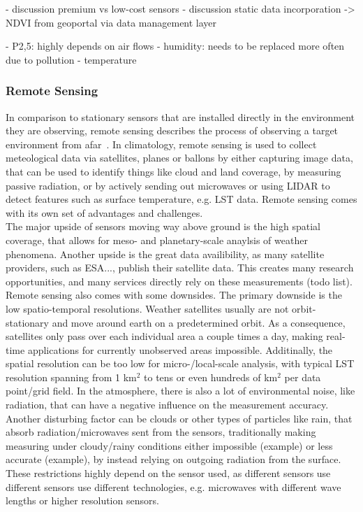 
- discussion premium vs low-cost sensors
- discussion static data incorporation -> NDVI from geoportal via data management layer

- P2,5: highly depends on air flows
- humidity: needs to be replaced more often due to pollution
- temperature

\subsubsection{Remote Sensing}

In comparison to stationary sensors that are installed directly in the environment they are observing, remote sensing describes the process of observing a target environment from afar~\cite{campbell2011introduction}. In climatology, remote sensing is used to collect meteological data via satellites, planes or ballons by either capturing image data, that can be used to identify things like cloud and land coverage, by measuring passive radiation, or by actively sending out microwaves or using LIDAR to detect features such as surface temperature, e.g. LST data. Remote sensing comes with its own set of advantages and challenges.\\
The major upside of sensors moving way above ground is the high spatial coverage, that allows for meso- and planetary-scale anaylsis of weather phenomena. Another upside is the great data availibility, as many satellite providers, such as ESA..., publish their satellite data. This creates many research opportunities, and many services directly rely on these measurements (todo list).\\ %
Remote sensing also comes with some downsides. The primary downside is the low spatio-temporal resolutions. Weather satellites usually are not orbit-stationary and move around earth on a predetermined orbit. As a consequence, satellites only pass over each individual area a couple times a day, making real-time applications for currently unobserved areas impossible. Additinally, the spatial resolution can be too low for micro-/local-scale analysis, with typical LST resolution spanning from 1 km$^{2}$ to tens or even hundreds of km$^{2}$ per data point/grid field. In the atmosphere, there is also a lot of environmental noise, like radiation, that can have a negative influence on the measurement accuracy. Another disturbing factor can be clouds or other types of particles like rain, that absorb radiation/microwaves sent from the sensors, traditionally making measuring under cloudy/rainy conditions either impossible (example) or less accurate (example), by instead relying on outgoing radiation from the surface. These restrictions highly depend on the sensor used, as different sensors use different 
sensors use different technologies, e.g. microwaves with different wave lengths or higher resolution sensors.

